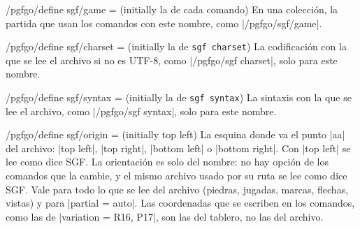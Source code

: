 \begin{key}{/pgfgo/define sgf/game =  (initially la de cada comando)}
	En una colección, la partida que usan los comandos con este nombre, como |/pgfgo/sgf/game|.

	\begin{codeexample}
	\end{codeexample}
\end{key}

\begin{key}{/pgfgo/define sgf/charset =  (initially la de \texttt{sgf charset})}
	La codificación con la que se lee el archivo si no es UTF-8, como |/pgfgo/sgf charset|, solo para este nombre.

	\begin{codeexample}
	\end{codeexample}
\end{key}

\begin{key}{/pgfgo/define sgf/syntax =  (initially la de \texttt{sgf syntax})}
	La sintaxis con la que se lee el archivo, como |/pgfgo/sgf syntax|, solo para este nombre.

	\begin{codeexample}
	\end{codeexample}
\end{key}

\begin{key}{/pgfgo/define sgf/origin =  (initially top left)}
	La esquina donde va el punto |aa| del archivo: |top left|, |top right|, |bottom left| o |bottom right|. Con |top left| se lee como dice SGF. La orientación es solo del nombre: no hay opción de los comandos que la cambie, y el mismo archivo usado por su ruta se lee como dice SGF. Vale para todo lo que se lee del archivo (piedras, jugadas, marcas, flechas, vistas) y para |partial = auto|. Las coordenadas que se escriben en los comandos, como las de |variation = {R16, P17}|, son las del tablero, no las del archivo.
\end{key}

